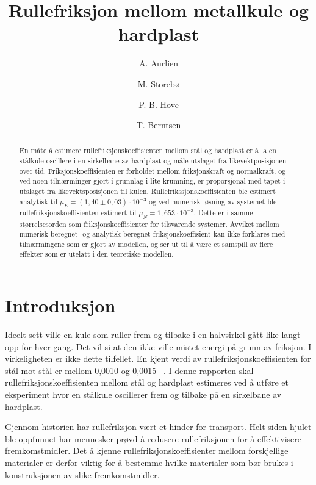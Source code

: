 \begin{frontmatter}

\title{Rullefriksjon mellom metallkule og hardplast}

\author[fysikk]{A. Aurlien}
\author[fysikk]{M. Storebø}
\author[fysikk]{P. B. Hove}
\author[fysikk]{T. Berntsen}

\address[fysikk]{Institutt for fysikk, Norges teknisk-naturvitenskapelige universitet, 7491 Trondheim.}

\begin{abstract}
En måte å estimere rullefriksjonskoeffisienten mellom stål og hardplast er å la en stålkule oscillere i en sirkelbane av hardplast og måle utslaget fra likevektposisjonen over tid.
Friksjonskoeffisienten er forholdet mellom friksjonskraft og normalkraft, og ved noen tilnærminger gjort i grunnlag i lite krumning, er proporsjonal med tapet i utslaget fra likevektsposisjonen til kulen.
Rullefrikssjonskoeffisienten ble estimert analytisk til $\mu_E = (1,40 \pm 0,03) \cdot 10^{-3}$ og ved numerisk løsning av systemet ble rullefriksjonskoeffisienten estimert til $\mu_N = 1,653 \cdot 10^{-3}$. Dette er i samme størrelsesorden som friksjonskoeffisienter for tilsvarende systemer.
Avviket mellom numerisk beregnet- og analytisk beregnet friksjonskoeffisient kan ikke forklares med tilnærmingene som er gjort av modellen, og ser ut til å være et samspill av flere effekter som er utelatt i den teoretiske modellen. 
\end{abstract}

\end{frontmatter}


\section{Introduksjon}
Ideelt sett ville en kule som ruller frem og tilbake i en halvsirkel gått like langt opp for hver gang. Det vil si at den ikke ville mistet energi på grunn av friksjon. I virkeligheten er ikke dette tilfellet. En kjent verdi av rullefriksjonskoeffisienten for stål mot stål er mellom 0,0010 og 0,0015 ~\cite{friksjonskoeffisienter}. I denne rapporten skal rullefriksjonskoeffisienten mellom stål og hardplast estimeres ved å utføre et eksperiment hvor en stålkule oscillerer frem og tilbake på en sirkelbane av hardplast.

Gjennom historien har rullefriksjon vært et hinder for transport. Helt siden hjulet ble oppfunnet har mennesker prøvd å redusere rullefriksjonen for å effektivisere fremkomstmidler. Det å kjenne rullefriksjonskoeffisienter mellom forskjellige materialer er derfor viktig for å bestemme hvilke materialer som bør brukes i konstruksjonen av slike fremkomstmidler.  



